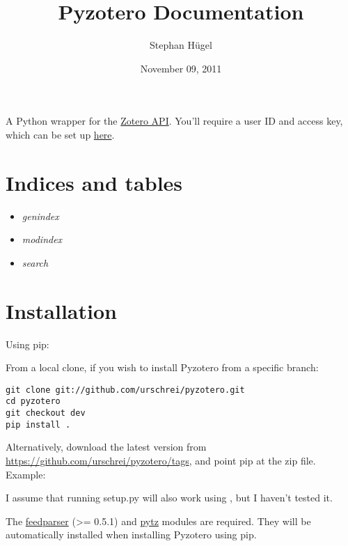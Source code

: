 \documentclass[letterpaper,10pt,english]{sphinxmanual}
\title{Pyzotero Documentation}
\date{November 09, 2011}
\author{Stephan Hügel}
\begin{document}
\maketitle
\tableofcontents
{}\label{index::doc}


A Python wrapper for the \href{http://www.zotero.org/support/dev/server\_api}{Zotero API}. You'll require a user ID and access key, which can be set up \href{http://www.zotero.org/settings/keys/new}{here}.
\label{index:module-pyzotero.zotero}

\chapter{Indices and tables}
\label{index:indices-and-tables}\label{index:description}\begin{itemize}
\item {} 
\emph{genindex}

\item {} 
\emph{modindex}

\item {} 
\emph{search}

\end{itemize}


\chapter{Installation}
\label{index:installation}
Using pip: 

From a local clone, if you wish to install Pyzotero from a specific branch:

\begin{Verbatim}[commandchars=\\\{\}]
git clone git://github.com/urschrei/pyzotero.git
cd pyzotero
git checkout dev
pip install .
\end{Verbatim}

Alternatively, download the latest version from \href{https://github.com/urschrei/pyzotero/tags}{https://github.com/urschrei/pyzotero/tags}, and point pip at the zip file.
Example: 

I assume that running setup.py will also work using , but I haven't tested it.

The \href{http://feedparser.org}{feedparser} (\textgreater{}= 0.5.1) and \href{http://pypi.python.org/pypi/pytz/}{pytz} modules are required. They will be automatically installed when installing Pyzotero using pip.
\end{document}
